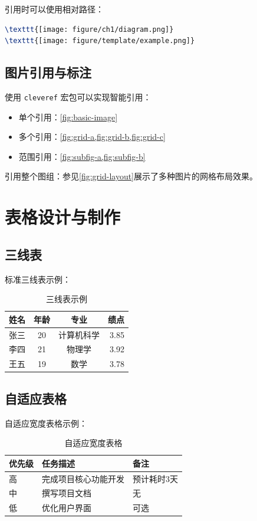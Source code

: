 \documentclass[../main]{subfiles}
\begin{document}
引用时可以使用相对路径：
\begin{lstlisting}[language=TeX, basicstyle=\ttfamily\small]
\texttt{[image: figure/ch1/diagram.png]}
\texttt{[image: figure/template/example.png]}
\end{lstlisting}

\subsection{图片引用与标注}
使用 \texttt{cleveref} 宏包可以实现智能引用：
\begin{itemize}
    \item 单个引用：\cref{fig:basic-image}
    \item 多个引用：\cref{fig:grid-a,fig:grid-b,fig:grid-c}
    \item 范围引用：\cref{fig:subfig-a,fig:subfig-b}
\end{itemize}

引用整个图组：参见\cref{fig:grid-layout}展示了多种图片的网格布局效果。

\section{表格设计与制作}

\subsection{三线表}
标准三线表示例：
\begin{table}[H]
    \centering
    \caption{三线表示例}
    \label{tab:booktabs}
    \begin{tabular}{lccr}
        \toprule
        姓名 & 年龄 & 专业 & 绩点 \\
        \midrule
        张三 & 20 & 计算机科学 & 3.85 \\
        李四 & 21 & 物理学 & 3.92 \\
        王五 & 19 & 数学 & 3.78 \\
        \bottomrule
    \end{tabular}
\end{table}

\subsection{自适应表格}
自适应宽度表格示例：
\begin{table}[H]
    \centering
    \caption{自适应宽度表格}
    \label{tab:tabularx}
    \begin{tabularx}{\textwidth}{|l|X|X|}
        \hline
        \textbf{优先级} & \textbf{任务描述} & \textbf{备注} \\
        \hline
        高 & 完成项目核心功能开发 & 预计耗时3天 \\
        \hline
        中 & 撰写项目文档 & 无 \\
        \hline
        低 & 优化用户界面 & 可选 \\
        \hline
    \end{tabularx}
\end{table}
\end{document}
